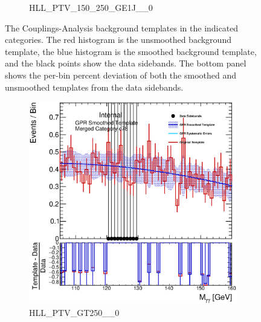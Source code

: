 \begin{figure}
\begin{center}
\begin{subfigure}[T]{0.49\linewidth}
	\caption{HLL\_PTV\_150\_250\_GE1J\_\_0}
\end{subfigure}
\caption{The Couplings-Analysis background templates in the indicated categories. The red histogram is the unsmoothed background template, the blue histogram is the smoothed background template, and the black points show the data sidebands. The bottom panel shows the per-bin percent deviation of both the smoothed and unsmoothed templates from the data sidebands. }
 \label{fig:gpr_coupcat_19}
 \end{center}
\end{figure}

\begin{figure}
\begin{center}
\begin{subfigure}[T]{0.49\linewidth}
	\centering
	\includegraphics[width=\linewidth]{figures/background/gpr/coupCatTemplates/GPR_Smoothed_Plot_hmgg_c78.eps}
	\caption{HLL\_PTV\_GT250\_\_0}
\end{subfigure}
\begin{subfigure}[T]{0.49\linewidth}
	\centering

\end{subfigure}
\end{center}
\end{figure}
